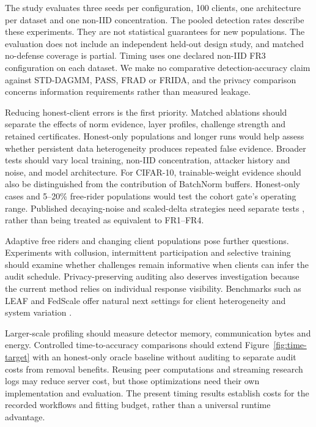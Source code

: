 \documentclass[conference]{IEEEtran}
\makeatletter
\renewcommand{\subsection}{\@startsection{subsection}{2}{\z@}{1.5ex}{0.7ex}{\normalfont\normalsize\itshape}}
\makeatother
\begin{document}
\subsection{Evaluation Scope and Future Work}
The study evaluates three seeds per configuration, 100 clients, one
architecture per dataset and one non-IID concentration. The pooled
detection rates describe these experiments. They are not statistical
guarantees for new populations. The evaluation does not include an
independent held-out design study, and matched no-defense coverage is
partial. Timing uses one declared non-IID FR3 configuration on each
dataset. We make no comparative detection-accuracy claim against
STD-DAGMM, PASS, FRAD or FRIDA, and the privacy comparison concerns
information requirements rather than measured leakage.

Reducing honest-client errors is the first priority. Matched ablations
should separate the effects of norm evidence, layer profiles, challenge
strength and retained certificates. Honest-only populations and longer
runs would help assess whether persistent data heterogeneity produces
repeated false evidence. Broader tests should vary local training,
non-IID concentration, attacker history and noise, and model architecture.
For CIFAR-10, trainable-weight evidence should also be distinguished from
the contribution of BatchNorm buffers. Honest-only cases and 5--20\%
free-rider populations would test the cohort gate's operating range.
Published decaying-noise and scaled-delta strategies need separate tests
\cite{fraboni2021freerider,zhu2021advanced}, rather than being treated
as equivalent to FR1--FR4.

Adaptive free riders and changing client populations pose further
questions. Experiments with collusion, intermittent participation and
selective training should examine whether challenges remain informative
when clients can infer the audit schedule. Privacy-preserving auditing
also deserves investigation because the current method relies on
individual response visibility.
Benchmarks such as LEAF and FedScale offer natural next settings for
client heterogeneity and system variation
\cite{caldas2018leaf,lai2022fedscale}.

Larger-scale profiling should measure detector memory,
communication bytes and energy. Controlled time-to-accuracy comparisons
should extend Figure~\ref{fig:time-target} with an honest-only oracle
baseline without auditing to separate audit costs from removal benefits.
Reusing peer computations and streaming research logs may reduce server
cost, but those optimizations need their own implementation and evaluation.
The present timing results establish costs for the recorded workflows
and fitting budget, rather than a universal runtime advantage.
\end{document}
